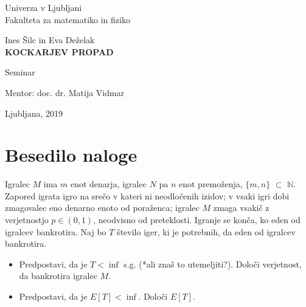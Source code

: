 \documentclass[12pt, a4paper]{article}
\begin{document}
\begin{titlepage}
\begin{center}

\large
Univerza v Ljubljani\\
\normalsize
Fakulteta za matematiko in fiziko\\

\vspace{3 cm} 

\large
Ines Šilc in Eva Deželak \\

\vspace{0.5cm}
\LARGE
\textbf{KOCKARJEV PROPAD}

\vspace{0.5 cm}
\normalsize
Seminar

\vspace{1.5cm}
\normalsize
Mentor: doc. dr. Matija Vidmar

\vspace{3cm}


\vfill

\large Ljubljana, 2019

\end{center}
\end{titlepage}

\newpage

\tableofcontents

\newpage

 \section[Besedilo naloge]{Besedilo naloge}


\begin{flushleft}
Igralec $M$ ima $m$ enot denarja, igralec $N$ pa $n$ enot premoženja, $\{m, n\}$ $\subset$ $\mathbb{N}$. Zapored igrata igro na srečo v kateri ni neodločenih izidov; v vsaki igri dobi zmagovalec eno denarno enoto od poraženca; igralec $M$ zmaga vsakič z verjetnostjo $p \in (0, 1)$, neodvisno od preteklosti. Igranje se konča, ko eden od igralcev bankrotira. Naj bo $T$ število iger, ki je potrebnih, da eden od igralcev bankrotira.

\begin{itemize}
    \item Predpostavi, da je $T < \inf$ s.g. (*ali znaš to utemeljiti?). Določi verjetnost, da bankrotira igralec $M$.
    \item Predpostavi, da je $E[T] < \inf$. Določi $E[T]$.
\end{itemize}
\end{flushleft}
\end{document}
